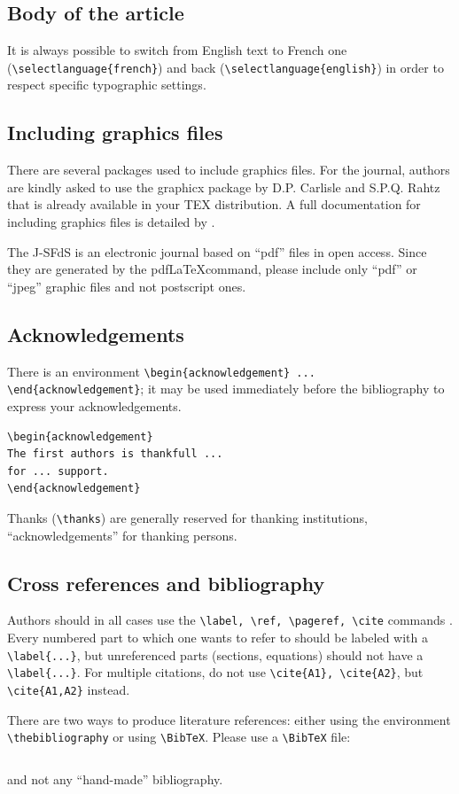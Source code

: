 \documentclass[submission]{jsfds}
\begin{document}
\subsection{Body of the article}
It is always possible to switch from English text to French one (\verb+\selectlanguage{french}+) and back (\verb+\selectlanguage{english}+) in order to respect specific typographic settings. 


\subsection{Including graphics files}
There are several packages used to include graphics files. For the journal, authors are kindly asked to use the graphicx package by D.P. Carlisle and S.P.Q. Rahtz that is already available in your TEX distribution. A full documentation for including graphics files is detailed by \cite{gooms94}. 

The J-SFdS is an electronic journal based on ``pdf'' files in open access. Since they are generated by the pdf\LaTeX command, please include only ``pdf'' or ``jpeg'' graphic files and not postscript ones.


\subsection{Acknowledgements}
There is an environment \verb+\begin{acknowledgement} ... \end{acknowledgement}+; it may be used immediately before the bibliography to express your acknowledgements.
\begin{verbatim}
\begin{acknowledgement}
The first authors is thankfull ...
for ... support.
\end{acknowledgement}
\end{verbatim}
Thanks (\verb+\thanks+) are generally reserved for thanking institutions, ``acknowledgements'' for thanking persons.


\subsection{Cross references and bibliography}
Authors should in all cases use the \verb+\label, \ref, \pageref, \cite+ commands . Every numbered part to which one wants to refer to should be labeled with a \verb+\label{...}+, but unreferenced parts (sections, equations) should not have a \verb+\label{...}+.
 For multiple citations, do not use \verb+\cite{A1}, \cite{A2}+, but \verb+\cite{A1,A2}+ instead.

There are two ways to produce literature references: either using the environment \verb+\thebibliography+ or using \verb+\BibTeX+. Please use a \verb+\BibTeX+ file:
\begin{verbatim}

\end{verbatim}
and not any ``hand-made'' bibliography.

\end{document}
